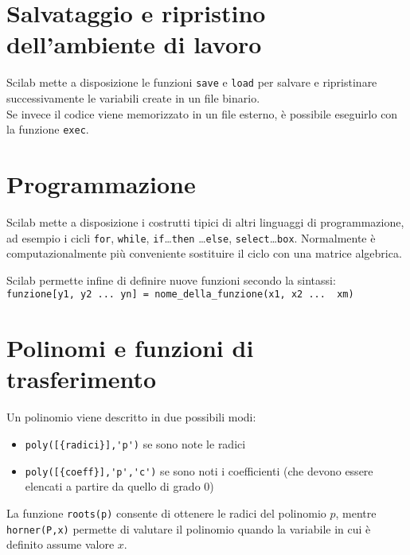 \section{Salvataggio e ripristino dell'ambiente di lavoro}

Scilab mette a disposizione le funzioni \verb+save+ e \verb+load+ per salvare e ripristinare successivamente le variabili create in un file binario.\\
Se invece il codice viene memorizzato in un file esterno, \`e possibile eseguirlo con la funzione \verb+exec+.

\section{Programmazione}

Scilab mette a disposizione i costrutti tipici di altri linguaggi di programmazione, ad esempio i cicli \verb+for+, \verb+while+, \verb+if+\ldots \verb+then+ \ldots \verb+else+, \verb+select+\ldots \verb+box+. Normalmente \`e computazionalmente pi\`u conveniente sostituire il ciclo con una matrice algebrica.

Scilab permette infine di definire nuove funzioni secondo la sintassi:
\verb+funzione[y1, y2 ... yn] = nome_della_funzione(x1, x2 ...  xm)+

\section{Polinomi e funzioni di trasferimento}

Un polinomio viene descritto in due possibili modi:
\begin{itemize}
\item \verb+poly([{radici}],'p')+ se sono note le radici
\item \verb+poly([{coeff}],'p','c')+ se sono noti i coefficienti (che devono essere elencati a partire da quello di grado 0)
\end{itemize}
La funzione \verb+roots(p)+ consente di ottenere le radici del polinomio $p$, mentre \verb+horner(P,x)+ permette di valutare il polinomio quando la variabile in cui \`e definito assume valore $x$.

